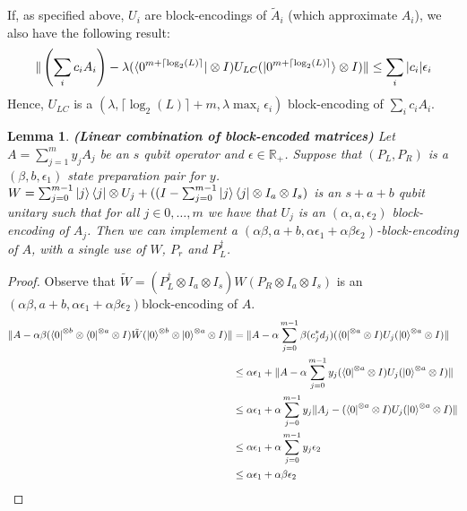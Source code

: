 \documentclass[12pt, oneside]{book}
\newtheorem{lemma}[theorem]{Lemma}
\theoremstyle{definition}
\theoremstyle{definition}
\theoremstyle{remark}
\begin{document}
If, as specified above, $U_i$ are block-encodings of $\tilde{A}_i$ (which approximate $A_i$), we also have the following result:
\[
\|\left(\sum_i c_i A_i\right)-\lambda(\bra{0^{m+\lceil\log_2(L)\rceil}}\otimes I)U_{LC}(\ket{0^{m+\lceil \log_2(L)\rceil}}\otimes I)\|\leq \sum_i |c_i|\epsilon_i
\]
Hence, $U_{LC}$ is a $(\lambda,\lceil \log_2(L)\rceil +m, \lambda \max_i \epsilon_i)$ block-encoding of $\sum_i c_iA_i$.
\begin{lemma}
    \textbf{(Linear combination of block-encoded matrices)} Let $A=\sum_{j=1}^m y_jA_j$ be an $s$ qubit operator and $\epsilon\in\mathbb{R}_+$. Suppose that $(P_L,P_R)$ is a $(\beta,b,\epsilon_1)$ state preparation pair for $y$. $W=\sum_{j=0}^{m-1}\ket{j}\bra{j}\otimes U_j + ((I-\sum_{j=0}^{m-1}\ket{j}\bra{j}\otimes I_a\otimes I_s)$ is an $s+a+b$ qubit unitary such that for all $j \in 0,\ldots,m$ we have that $U_j$ is an $(\alpha, a,\epsilon_2)$ block-encoding of $A_j$. Then we can implement a $(\alpha\beta,a+b,\alpha\epsilon_1+\alpha\beta\epsilon_2)$-block-encoding of $A$, with a single use of $W$, $P_r$ and $P_L^{\dagger}$.
\end{lemma}
\begin{proof}
    Observe that $\tilde{W}=(P_L^{\dagger}\otimes I_a\otimes I_s)W(P_R\otimes I_a\otimes I_s)$ is an $(\alpha\beta,a+b,\alpha\epsilon_1+\alpha\beta\epsilon_2)$block-encoding of $A$.
    \begin{align*}
        \|A-\alpha\beta(\bra{0}^{\otimes b}\otimes \bra{0}^{\otimes a}\otimes I)\tilde{W}(\ket{0}^{\otimes b}\otimes \ket{0}^{\otimes a}\otimes I)\|&=\|A-\alpha\sum_{j=0}^{m-1}\beta(c_j^*d_j)(\bra{0}^{\otimes a}\otimes I)U_j(\ket{0}^{\otimes a}\otimes I)\|\\
        &\leq \alpha\epsilon_1 +\|A-\alpha\sum_{j=0}^{m-1}y_j (\bra{0}^{\otimes a}\otimes I)U_j (\ket{0}^{\otimes a}\otimes I)\|\\
        &\leq \alpha\epsilon_1 + \alpha\sum_{j=0}^{m-1}y_j \|A_j - (\bra{0}^{\otimes a}\otimes I)U_j(\ket{0}^{\otimes a}\otimes I)\|\\
        &\leq \alpha\epsilon_1 +\alpha\sum_{j=0}^{m-1}y_j\epsilon_2\\
        &\leq \alpha\epsilon_1 +\alpha\beta\epsilon_2
    \end{align*}
\end{proof}
\end{document}
